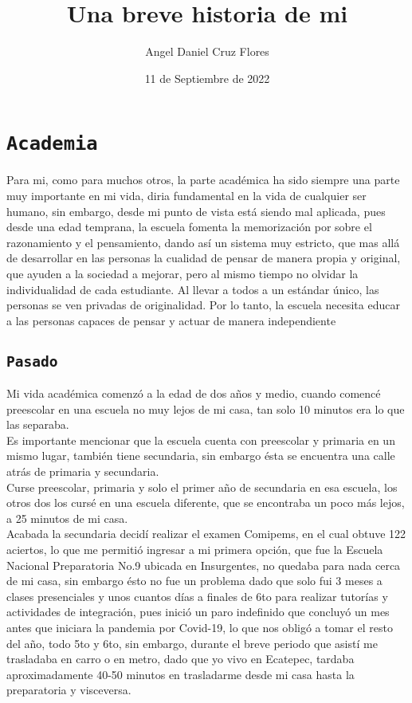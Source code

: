 \documentclass[12pt, letterpaper]{article}
\title{Una breve historia de mi}
\author{Angel Daniel Cruz Flores }
\date{11 de Septiembre de 2022}
\begin{document}
\maketitle


\section{\tt{\LARGE{Academia}}}

\normalsize{
Para mi, como para muchos otros, la parte académica ha sido siempre una parte muy importante en mi vida, diria fundamental en la vida de cualquier ser humano, sin embargo, desde mi punto de vista está siendo mal aplicada, pues desde una edad temprana, la escuela fomenta la memorización por sobre el razonamiento y el pensamiento, dando así un sistema muy estricto, que mas allá de desarrollar en las personas la cualidad de pensar de manera propia y original,  que ayuden a la sociedad a mejorar, pero al mismo tiempo no olvidar la individualidad de cada estudiante. Al llevar a todos a un estándar único, las personas se ven privadas de originalidad. Por lo tanto, la escuela necesita educar a las personas capaces de pensar y actuar de manera independiente
}



    \subsection{\tt{\large{Pasado}}}
    
    \small{
    Mi vida académica comenzó a la edad de dos años y medio, cuando comencé preescolar en una escuela no muy lejos de mi casa, tan solo 10 minutos era lo que las separaba.\\
    
    Es importante mencionar que la escuela cuenta con preescolar y primaria en un mismo lugar, también tiene secundaria, sin embargo ésta se encuentra una calle atrás de primaria y secundaria.\\
    
    Curse preescolar, primaria y solo el primer año de secundaria en esa escuela, los otros dos los cursé en una escuela diferente, que se encontraba un poco más lejos, a 25 minutos de mi casa.\\
    
    Acabada la secundaria decidí realizar el examen Comipems, en el cual obtuve 122 aciertos, lo que me permitió ingresar a mi primera opción, que fue la Escuela Nacional Preparatoria No.9 ubicada en Insurgentes, no quedaba para nada cerca de mi casa, sin embargo ésto no fue un problema dado que solo fui 3 meses a clases presenciales y unos cuantos días a finales de 6to para realizar tutorías y actividades de integración, pues inició un paro indefinido que concluyó un mes antes que iniciara la pandemia por Covid-19, lo que nos obligó a tomar el resto del año, todo 5to y 6to, sin embargo, durante el breve periodo que asistí me trasladaba en carro o en metro, dado que yo vivo en Ecatepec, tardaba aproximadamente 40-50 minutos en trasladarme desde mi casa hasta la preparatoria y visceversa. 
    }
    
\end{document}
